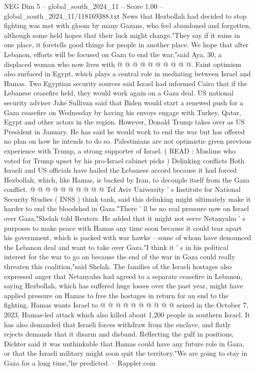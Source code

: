 \begin{textsample}{NEG Dim 5 – global\_south\_2024\_11 – Score 1.00 – global\_south\_2024\_11/118169388.txt}
News that Hezbollah had decided to stop fighting was met with gloom by many Gazans, who feel abandoned and forgotten, although some held hopes that their luck might change."They say if it rains in one place, it foretells good things for people in another place.
We hope that after Lebanon, efforts will be focused on Gaza to end the war,"said Aya, 30, a displaced woman who now lives with @ @ @ @ @ @ @ @ @ @.
Faint optimism also surfaced in Egypt, which plays a central role in mediating between Israel and Hamas.
Two Egyptian security sources said Israel had informed Cairo that if the Lebanese ceasefire held, they would work again on a Gaza deal.
US national security adviser Jake Sullivan said that Biden would start a renewed push for a Gaza ceasefire on Wednesday by having his envoys engage with Turkey, Qatar, Egypt and other actors in the region.
However, Donald Trump takes over as US President in January.
He has said he would work to end the war but has offered no plan on how he intends to do so.
Palestinians are not optimistic given previous experience with Trump, a strong supporter of Israel. ( READ : Muslims who voted for Trump upset by his pro-Israel cabinet picks ) Delinking conflicts Both Israeli and US officials have hailed the Lebanese accord because it had forced Hezbollah, which, like Hamas, is backed by Iran, to decouple itself from the Gaza conflict. @ @ @ @ @ @ @ @ @ @ Tel Aviv University ' s Institute for National Security Studies ( INSS ) think tank, said this delinking might ultimately make it harder to end the bloodshed in Gaza."There ' ll be no real pressure now on Israel over Gaza,"Shelah told Reuters.
He added that it might not serve Netanyahu ' s purposes to make peace with Hamas any time soon because it could tear apart his government, which is packed with war hawks -- some of whom have denounced the Lebanon deal and want to take over Gaza."I think it ' s in his political interest for the war to go on because the end of the war in Gaza could really threaten this coalition,"said Shelah.
The families of the Israeli hostages also expressed anger that Netanyahu had agreed to a separate ceasefire in Lebanon, saying Hezbollah, which has suffered huge losses over the past year, might have applied pressure on Hamas to free the hostages in return for an end to the fighting.
Hamas wants Israel to @ @ @ @ @ @ @ @ @ @ seized in the October 7, 2023, Hamas-led attack which also killed about 1,200 people in southern Israel.
It has also demanded that Israeli forces withdraw from the enclave, and flatly rejects demands that it disarm and disband.
Reflecting the gulf in positions, Dichter said it was unthinkable that Hamas could have any future role in Gaza, or that the Israeli military might soon quit the territory."We are going to stay in Gaza for a long time,"he predicted. -- Rappler.com

\end{textsample}
